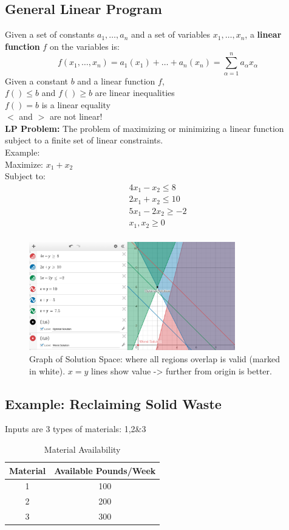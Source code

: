 \documentclass[12pt, letter]{article}
\begin{document}
\subsection*{General Linear Program}
Given a set of constants $a_1, \ldots, a_n$ and a set of variables $x_1, \ldots, x_n$, a \textbf{linear function} $f$ on the variables is:
\[
f(x_1,\ldots,x_n) = a_1(x_1)+\ldots+a_n(x_n) = \sum_{\alpha=1}^{n} a_{\alpha}x_{\alpha}
\] 
Given a constant $b$ and a linear function $f$, \\
$f\left( \right) \le b$ and $f\left( \right) \ge b$ are linear inequalities \\
$f\left( \right) = b$ is a linear equality \\
$<$ and $>$ are not linear! \\

\textbf{LP Problem: } The problem of maximizing or minimizing a linear function subject to a finite set of linear constraints. \\
Example: \\
Maximize: $x_1 + x_2$ \\
Subject to: \\
\begin{gather*}
4x_1-x_2 \le 8 \\
2x_1+x_2 \le 10 \\
5x_1-2x_2 \ge -2 \\
x_1,x_2 \ge 0 \\
\end{gather*}

\begin{figure}[h]
	\centering
	\includegraphics[width=0.8\textwidth]{graph2}
	\caption{Graph of Solution Space: where all regions overlap is valid (marked in white). $x=y$ lines show value -> further from origin is better.}
	\label{fig:graph}
\end{figure}

\subsection*{Example: Reclaiming Solid Waste}
Inputs are 3 types of materials: 1,2\&3 \\
\begin{table}[h]
	\centering
	\caption{Material Availability}
	\begin{tabular}{cc}
	Material & Available Pounds/Week \\
	\hline
	1 & 100 \\
	\hline
	2 & 200 \\
	\hline
	3 & 300 \\
	\hline
	\end{tabular}
\end{table}
\end{document}
